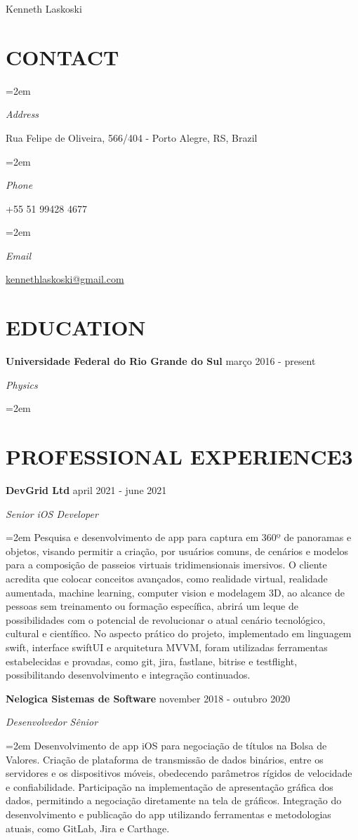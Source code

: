 \documentclass[paper=a4,fontsize=11pt]{scrartcl} %
\newlength{\spacebox}
\newcommand{\sepspace}{\vspace*{1em}}		%
\newcommand{\MyName}[1]{ %
		\Huge \usefont{OT1}{phv}{b}{n} \hfill #1
		\par \normalsize \normalfont}
\newcommand{\MySlogan}[1]{ %
		\large \usefont{OT1}{phv}{m}{n}\hfill \textit{#1}
		\par \normalsize \normalfont}
\newcommand{\NewPart}[1]{\section*{\uppercase{#1}}}
\newcommand{\PersonalEntry}[2]{
		\noindent\hangindent=2em\hangafter=0 %
		\parbox{\spacebox}{        %
		\textit{#1}}		       %
		\hspace{1.5em} #2 \par}    %
\newcommand{\EducationEntry}[4]{
		\noindent \textbf{#1} \hfill      %
        #2 \par
		\noindent \textit{#3} \par        %
		\noindent\hangindent=2em\hangafter=0 \small #4 %
		\normalsize \par}
\newcommand{\WorkEntry}[4]{				  %
		\noindent \textbf{#1} \hfill      %
        #2 \par
		\noindent \textit{#3} \par        %
		\noindent\hangindent=2em\hangafter=0 \small #4 %
		\normalsize \par}
\begin{document}

\MyName{Kenneth Laskoski}

\sepspace

\NewPart{Contact}{}

\PersonalEntry{Address}{Rua Felipe de Oliveira, 566/404 - Porto Alegre, RS, Brazil}
\PersonalEntry{Phone}{+55 51 99428 4677}
\PersonalEntry{Email}{\url{kennethlaskoski@gmail.com}}

\NewPart{Education}{}

\EducationEntry{Universidade Federal do Rio Grande do Sul}{março 2016 - present}{Physics}
\sepspace

\NewPart{Professional Experience3}{}

\WorkEntry{DevGrid Ltd}{april 2021 - june 2021}{Senior iOS Developer}{ Pesquisa e desenvolvimento de app para captura em 360º de panoramas e objetos, visando permitir a criação, por usuários comuns, de cenários e modelos para a composição de passeios virtuais tridimensionais imersivos. O cliente acredita que colocar conceitos avançados, como realidade virtual, realidade aumentada, machine learning, computer vision e modelagem 3D, ao alcance de pessoas sem treinamento ou formação específica, abrirá um leque de possibilidades com o potencial de revolucionar o atual cenário tecnológico, cultural e científico. No aspecto prático do projeto, implementado em linguagem swift, interface swiftUI e arquitetura MVVM, foram utilizadas ferramentas estabelecidas e provadas, como git, jira, fastlane, bitrise e testflight, possibilitando desenvolvimento e integração continuados.}
\sepspace
\sepspace

\WorkEntry{Nelogica Sistemas de Software}{november 2018 - outubro 2020}{Desenvolvedor Sênior}{Desenvolvimento de app iOS para negociação de títulos na Bolsa de Valores. Criação de plataforma de transmissão de dados binários, entre os servidores e os dispositivos móveis, obedecendo parâmetros rígidos de velocidade e confiabilidade. Participação na implementação de apresentação gráfica dos dados, permitindo a negociação diretamente na tela de gráficos. Integração do desenvolvimento e publicação do app utilizando ferramentas e metodologias atuais, como GitLab, Jira e Carthage.}
\sepspace
\sepspace
\end{document}
